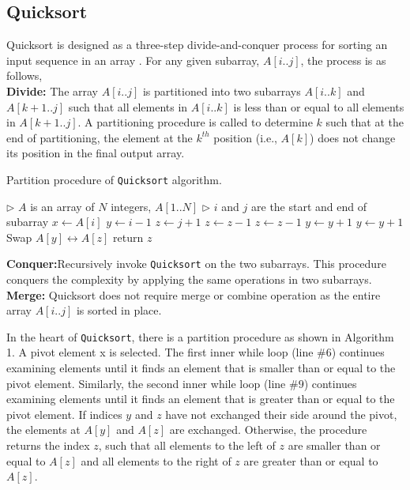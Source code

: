 \documentclass[a4paper,10pt]{article}
\begin{document}
\begin{multicols*}{2}
\section{Quicksort}

Quicksort is designed as a three-step divide-and-conquer process for sorting an input sequence in an array \cite{clrs}. For any given subarray, $A[i..j]$, the process is as follows, \\
\textbf{Divide:} The array $A[i..j]$ is partitioned into two subarrays $A[i..k]$ and $A[k + 1..j]$ such that all elements in $A[i..k]$ is less than or equal to all elements in $A[k + 1..j]$. A partitioning procedure is called to determine $k$ such that at the end of partitioning, the element at the $k^{th}$ position (i.e., $A[k]$) does not change its position in the final output array.

\begin{algorithm}[H]
\caption{Partition procedure of \texttt{Quicksort} algorithm.}\label{Q1}
\begin{algorithmic}[1]
\Statex \(\triangleright\) $A$ is an array of $N$ integers, $A[1..N]$
\Statex \(\triangleright\) $i$ and $j$ are the start and end of subarray
\State $x\gets A[i]$
\State $y\gets i-1$
\State $z\gets j+1$
    \State $z\gets z - 1$
        \State $z\gets z - 1$
    \EndWhile
    \State $y\gets y+1$
        \State $y\gets y + 1$
    \EndWhile
        \State Swap $A[y] \leftrightarrow A[z]$
    \Else
        \State return $z$
    \EndIf
\EndWhile
\EndProcedure
\end{algorithmic}
\end{algorithm}
\textbf{Conquer:}Recursively invoke \texttt{Quicksort} on the two subarrays. This procedure conquers the complexity by applying the same operations in two subarrays.\\
\textbf{Merge:} Quicksort does not require merge or combine operation as the entire array $A[i..j]$ is sorted in place.
\par
In the heart of \texttt{Quicksort}, there is a partition procedure as shown in Algorithm 1. A pivot element x is selected. The first inner while loop (line $\#6$) continues examining elements until it finds an element that is smaller than or equal to the pivot element. Similarly, the second inner while loop (line $\#9$) continues examining elements until it finds an element that is greater than or equal to the pivot element. If indices $y$ and $z$ have not exchanged their side around the pivot, the elements at $A[y]$ and $A[z]$ are exchanged. Otherwise, the procedure returns the index $z$, such that all elements to the left of $z$ are smaller than or equal to $A[z]$ and all elements to the right of $z$ are greater than or equal to $A[z]$.
\par


\end{multicols*}
\end{document}
